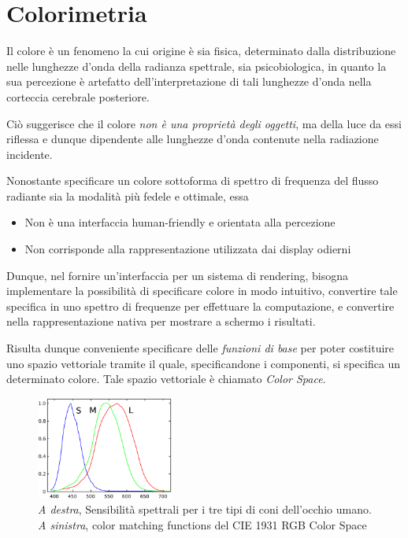 \section{Colorimetria}\label{chapter2:section:colorimetry}
Il colore \`e un fenomeno la cui origine \`e sia fisica, determinato dalla distribuzione nelle lunghezze d'onda della radianza spettrale, sia 
psicobiologica, in quanto la sua percezione \`e artefatto dell'interpretazione di tali lunghezze d'onda nella corteccia cerebrale posteriore.\par
Ci\`o suggerisce che il colore \textit{non \`e una propriet\`a degli oggetti}, ma della luce da essi riflessa e dunque dipendente alle lunghezze d'onda
contenute nella radiazione incidente.\par
Nonostante specificare un colore sottoforma di spettro di frequenza del flusso radiante sia la modalit\`a pi\`u fedele e ottimale, essa
\begin{itemize}[topsep=0pt, noitemsep]
	\item Non \`e una interfaccia human-friendly e orientata alla percezione
	\item Non corrisponde alla rappresentazione utilizzata dai display odierni
\end{itemize}
Dunque, nel fornire un'interfaccia per un sistema di rendering, bisogna implementare la possibilit\`a di specificare colore in modo intuitivo, 
convertire tale specifica in uno spettro di frequenze per effettuare la computazione, e convertire nella rappresentazione nativa per mostrare a schermo
i risultati.\par
\begin{definitionS}
	Risulta dunque conveniente specificare delle \textit{funzioni di base} per poter costituire uno spazio vettoriale tramite il quale, specificandone
	i componenti, si specifica un determinato colore. Tale spazio vettoriale \`e chiamato \textit{Color Space}.
\end{definitionS}
\begin{figure}
	\centering
	\includegraphics[width=0.4\textwidth]{../assets/chapter2_colorimetry_cones.png}
	
	\label{chapter2:figure:coneSpectralSensitivity}
	\label{chapter2:figure:RGBColorMatchingFunctions}
	\caption{\textit{A destra}, Sensibilit\`a spettrali per i tre tipi di coni dell'occhio umano. \textit{A sinistra}, color matching functions del 
			CIE 1931 RGB Color Space}
\end{figure}
